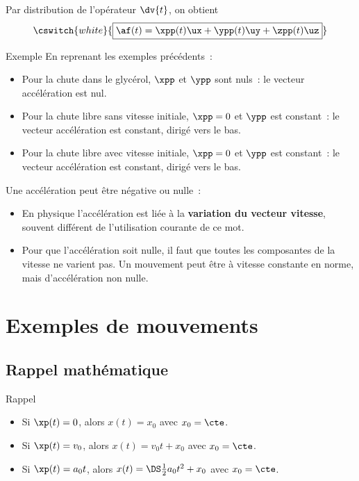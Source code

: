 \documentclass[../main/main.tex]{subfiles}
\begin{document}
Par distribution de l'opérateur $\dv{t}$, on obtient
\[\cswitch{white}{\boxed{\af(t) = \xpp(t)\ux + \ypp(t)\uy + \zpp(t)\uz}}\]

\begin{rexem}{Exemple}
    En reprenant les exemples précédents~:
    \begin{itemize}
        \item Pour la chute dans le glycérol, $\xpp$ et $\ypp$ sont nuls~: le
            vecteur accélération est nul.
        \item Pour la chute libre sans vitesse initiale, $\xpp = 0$ et $\ypp$
            est constant~: le vecteur accélération est constant, dirigé vers le
            bas.
        \item Pour la chute libre avec vitesse initiale, $\xpp = 0$ et $\ypp$
            est constant~: le vecteur accélération est constant, dirigé vers le
            bas.
    \end{itemize}
\end{rexem}

\begin{bimpo}{}
    Une accélération peut être négative ou nulle~:
    \begin{itemize}
        \item En physique l'accélération est liée à la \textbf{variation du
            vecteur vitesse}, souvent différent de l'utilisation courante de ce
            mot.
        \item Pour que l'accélération soit nulle, il faut que toutes les
            composantes de la vitesse ne varient pas. Un mouvement peut être à
            vitesse constante en norme, mais d'accélération non nulle.
    \end{itemize}
\end{bimpo}

\section{Exemples de mouvements}
\subsection{Rappel mathématique}
\begin{rrapp}{Rappel}
    \begin{itemize}
        \item Si $\xp(t) = 0$, alors $x(t) = x_0$ avec $x_0 = \cte$.
        \item Si $\xp(t) = v_0$, alors $x(t) = v_0t + x_0$ avec $x_0 = \cte$.
        \item Si $\xp(t) = a_0t$, alors $x(t) = \DS \frac{1}{2}a_0t^2 +  x_0$
            avec $x_0 = \cte$.
    \end{itemize}
\end{rrapp}
\end{document}
